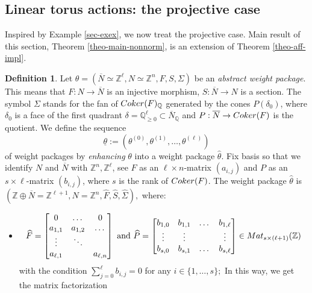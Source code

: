 \documentclass[11pt, reqno]{amsart}
\theoremstyle{plain}
\theoremstyle{definition}
\newtheorem{definition}[theorem]{Definition}
\theoremstyle{remark}
\begin{document}
\subsection{Linear torus actions: the projective case}\label{sec-projproj}
Inspired by Example \ref{sec-exex}, we now treat the projective case. 
 Main result of this section, Theorem \ref{theo-main-nonnorm}, is an extension of Theorem \ref{theo-aff-impl}. 
\begin{definition}\label{def-enhance}
Let $\theta =  (\overline{N}\simeq \mathbb{Z}^{\ell}, N \simeq \mathbb{Z}^{n}, F, S, \Sigma)$ be an \emph{abstract weight package}. This means that $F: N\rightarrow \overline{N}$ is an injective morphism, $S: \overline{N}\rightarrow N$ is a section. The symbol $\Sigma$ stands for the fan of ${\rm Coker}(F)_{\mathbb{Q}}$ generated by the cones $P(\delta_{0})$, where $\delta_{0}$ is a face of the first quadrant $\delta =  \mathbb{Q}_{\geq 0}^{\ell}\subset \overline{N}_{\mathbb{Q}}$ and $P:\overline{N}\rightarrow {\rm Coker}(F)$ is the quotient. We define the sequence 
$$\underline{\theta}:= (\theta^{(0)}, \theta^{(1)}, \ldots, \theta^{(\ell)})$$ of weight packages by \emph{enhancing} $\theta$ into a weight package $\widehat{\theta}$. Fix  basis 
so that we identify $N$ and $\overline{N}$  with $\mathbb{Z}^{n}, \mathbb{Z}^{\ell}$, see $F$ as an 
$\ell\times n$-matrix $(a_{i,j})$ and $P$ as an $s\times \ell$-matrix $(b_{i,j})$, where $s$ is the rank of ${\rm Coker}(F)$. The weight package $\widehat{\theta}$
is 
$(\mathbb{Z}\oplus \overline{N} =  \mathbb{Z}^{\ell +1}, N  =  \mathbb{Z}^{n}, \widehat{F}, \widehat{S}, \widehat{\Sigma}),$ where:
\begin{itemize}
\item[(1)]
$$\widehat{F} = \begin{bmatrix} 
  0 & \dots & 0 \\
    a_{1,1} & a_{1,2} & \dots \\
    \vdots & \ddots & \\
    a_{\ell,1} &        & a_{\ell, n} 
    \end{bmatrix} \text{ and }
\widehat{P} =   \begin{bmatrix} 
    b_{1, 0} & b_{1,1} & \dots & b_{1, \ell}\\
    \vdots &  \vdots &     & \vdots  \\
    b_{s, 0} & b_{s,1} & \dots & b_{s, \ell}
    \end{bmatrix}\in {\rm Mat}_{s\times (\ell + 1)}(\mathbb{Z})$$
with the condition $\sum_{j = 0}^{\ell}b_{i,j} = 0$ for any $i\in \{1, \ldots, s\};$ In this way, we get the matrix factorization 

\end{itemize}
\end{definition}
\end{document}
